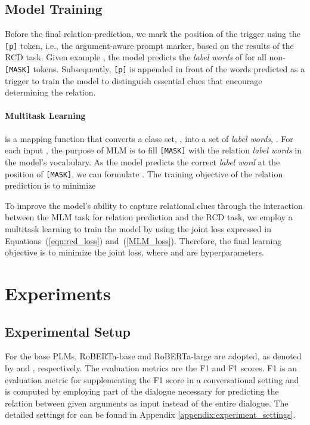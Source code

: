 \documentclass[11pt]{article}
\begin{document}
\subsection{Model Training} \label{subsec:model_training}
Before the final relation-prediction, 
we mark the position of the trigger using the \texttt{[p]} token, i.e., the argument-aware prompt marker, based on the results of the RCD task.
Given example , the model predicts the \textit{label words} of  for all non-\texttt{[MASK]} tokens. Subsequently, \texttt{[p]} is appended in front of the words predicted as a trigger to train the model to distinguish essential clues that encourage determining the relation. 

\paragraph{Multitask Learning}

 is a mapping function that converts a class set, , into a set of \textit{label words}, . 
For each input , the purpose of MLM is to fill \texttt{[MASK]} with the relation \textit{label words} in the model's vocabulary.
As the model predicts the correct \textit{label word} at the position of \texttt{[MASK]}, we can formulate .
The training objective of the relation prediction is to minimize


To improve the model's ability to capture relational clues through the interaction between the MLM task for relation prediction and the RCD task,
we employ a multitask learning to train the  model by using the joint loss expressed in Equations~(\ref{equ:rcd_loss}) and~(\ref{MLM_loss}). Therefore, the final learning objective is to minimize the joint loss, where  and  are hyperparameters.


\section{Experiments\label{sec:experiments}}
\subsection{Experimental Setup}
For the base PLMs, RoBERTa-base and RoBERTa-large are adopted, as denoted by  and , respectively. The evaluation metrics are the F1 and F1 \citep{yu-etal-2020-dialogue} scores. F1 is an evaluation metric for supplementing the F1 score in a conversational setting and is computed by employing part of the dialogue necessary for predicting the relation between given arguments as input instead of the entire dialogue. The detailed settings for  can be found in Appendix \ref{appendix:experiment_settings}.
\end{document}
